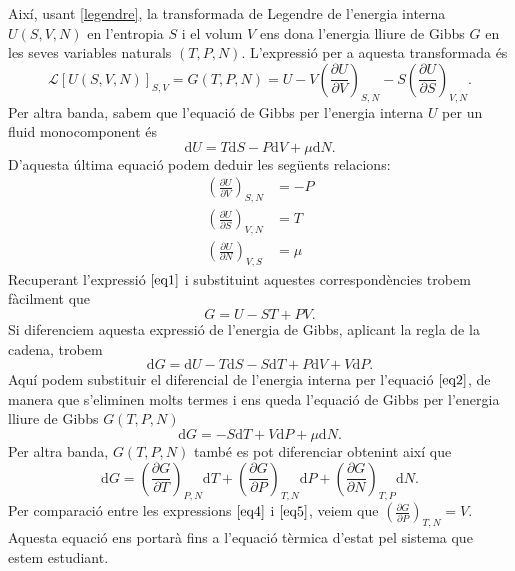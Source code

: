 \documentclass[a4paper, 10pt]{article}
\begin{document}
Així, usant \eqref{legendre}, la transformada de Legendre de l'energia interna $U(S,V,N)$ en l'entropia $S$ i el volum $V$ ens dona l'energia lliure de Gibbs $G$ en les seves variables naturals $(T,P,N)$. L'expressió per a aquesta transformada és
\begin{equation}
	\mathcal{L}[U(S,V,N)]_{S,V}=G(T,P,N)=U-V\left(\frac{\partial U}{\partial V}\right)_{S,N}-S\left(\frac{\partial U}{\partial S}\right)_{V,N}.
\label{eq1}
\end{equation}
Per altra banda, sabem que l'equació de Gibbs per l'energia interna $U$ per un fluid monocomponent és
\begin{equation}
	\mathrm{d}U= T\mathrm{d}S - P\mathrm{d}V + \mu \mathrm{d}N.
\label{eq2}
\end{equation}
D'aquesta última equació podem deduir les següents relacions:
\begin{align*}
	\left(\frac{\partial U}{\partial V}\right)_{S,N} &=  -P \\
	\left(\frac{\partial U}{\partial S}\right)_{V,N} &=  T \\
	\left(\frac{\partial U}{\partial N}\right)_{V,S} &=  \mu 
\end{align*}
Recuperant l'expressió $\eqref{eq1}$ i substituint aquestes correspondències trobem fàcilment que
\begin{equation}
	G=U-ST+PV.
\label{eq3}
\end{equation}
Si diferenciem aquesta expressió de l'energia de Gibbs, aplicant la regla de la cadena, trobem
\begin{equation*}
	\mathrm{d}G=\mathrm{d}U-T\mathrm{d}S-S\mathrm{d}T+P\mathrm{d}V+V\mathrm{d}P.
\end{equation*}
Aquí podem substituir el diferencial de l'energia interna per l'equació $\eqref{eq2}$, de manera que s'eliminen molts termes i ens queda l'equació de Gibbs per l'energia lliure de Gibbs $G(T,P,N)$
\begin{equation}
	\mathrm{d}G=-S\mathrm{d}T+V\mathrm{d}P+\mu \mathrm{d}N.
\label{eq4}
\end{equation}
Per altra banda, $G(T,P,N)$ també es pot diferenciar obtenint així que
\begin{equation}
	\mathrm{d}G=\left(\frac{\partial G}{\partial T}\right)_{P,N} \mathrm{d}T + \left(\frac{\partial G}{\partial P}\right)_{T,N} \mathrm{d}P + \left(\frac{\partial G}{\partial N}\right)_{T,P} \mathrm{d}N.
\label{eq5}
\end{equation}
Per comparació entre les expressions $\eqref{eq4}$ i $\eqref{eq5}$, veiem que $\left(\frac{\partial G}{\partial P}\right)_{T,N} = V$. Aquesta equació ens portarà fins a l'equació tèrmica d'estat pel sistema que estem estudiant.
\end{document}
